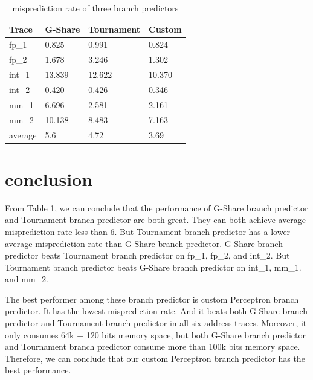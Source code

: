 \documentclass[conference]{IEEEtran}
\begin{document}
\begin{scriptsize}
\begin{table}[h!]
  \centering
  \caption{misprediction rate of three branch predictors}
  \label{table:formatting}
  \begin{tabular}{|l|l|l|l|}
    \hline
    \textbf{Trace} & \textbf{G-Share} & \textbf{Tournament} & \textbf{Custom}\\
    \hline
    fp\_1 & 0.825 & 0.991 & 0.824\\
    \hline
    fp\_2 & 1.678 & 3.246 & 1.302\\
    \hline
    int\_1 & 13.839 & 12.622 & 10.370\\
    \hline
    int\_2 & 0.420 & 0.426 & 0.346\\
    \hline
    mm\_1 & 6.696 & 2.581 & 2.161\\
    \hline
    mm\_2 & 10.138 & 8.483 & 7.163\\
    \hline
    average & 5.6 & 4.72 & 3.69\\
    \hline
  \end{tabular}
\end{table}
\end{scriptsize}

\section{conclusion}
From Table 1, we can conclude that the performance of G-Share branch predictor and Tournament branch predictor are both great. They can both achieve average misprediction rate less than 6. But 
Tournament branch predictor has a lower average misprediction rate than G-Share branch predictor. 
G-Share branch predictor beats Tournament branch predictor on fp\_1, fp\_2, and int\_2. But Tournament branch predictor beats G-Share branch predictor on int\_1, mm\_1. and mm\_2. 

The best performer among these branch predictor is custom Perceptron branch predictor. It has the lowest misprediction rate. And it beats both G-Share branch predictor and Tournament branch predictor in all
six address traces. Moreover, it only consumes 64k + 120 bits memory space, but both G-Share branch predictor and Tournament branch predictor consume more than 100k bits memory space. Therefore, we can conclude that our 
custom Perceptron branch predictor has the best performance. 
\end{document}

